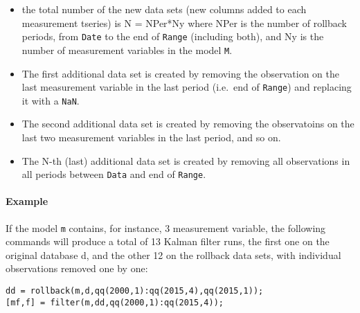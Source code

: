 \begin{itemize}
\item
  the total number of the new data sets (new columns added to each
  measurement tseries) is N = NPer*Ny where NPer is the number of
  rollback periods, from \texttt{Date} to the end of \texttt{Range}
  (including both), and Ny is the number of measurement variables in the
  model \texttt{M}.
\item
  The first additional data set is created by removing the observation
  on the last measurement variable in the last period (i.e.~end of
  \texttt{Range}) and replacing it with a \texttt{NaN}.
\item
  The second additional data set is created by removing the observatoins
  on the last two measurement variables in the last period, and so on.
\item
  The N-th (last) additional data set is created by removing all
  observations in all periods between \texttt{Data} and end of
  \texttt{Range}.
\end{itemize}

\paragraph{Example}

If the model \texttt{m} contains, for instance, 3 measurement variable,
the following commands will produce a total of 13 Kalman filter runs,
the first one on the original database d, and the other 12 on the
rollback data sets, with individual observations removed one by one:

\begin{verbatim}
dd = rollback(m,d,qq(2000,1):qq(2015,4),qq(2015,1));
[mf,f] = filter(m,dd,qq(2000,1):qq(2015,4));
\end{verbatim}


